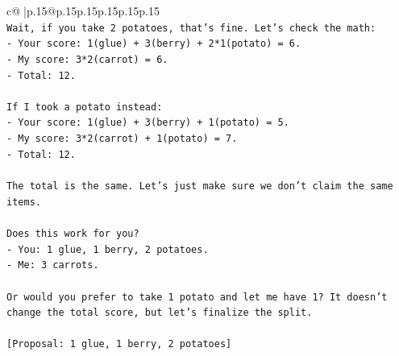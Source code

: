 \documentclass{article}
\begin{document}
{\begin{supertabular}{c@{$\;$}|p{.15\linewidth}@{}p{.15\linewidth}p{.15\linewidth}p{.15\linewidth}p{.15\linewidth}p{.15\linewidth}}
{{{\\ 
\texttt{Wait, if you take 2 potatoes, that's fine. Let's check the math:} \\
\texttt{{-} Your score: 1(glue) + 3(berry) + 2*1(potato) = 6.} \\
\texttt{{-} My score: 3*2(carrot) = 6.} \\
\texttt{{-} Total: 12.} \\
\\ 
\texttt{If I took a potato instead:} \\
\texttt{{-} Your score: 1(glue) + 3(berry) + 1(potato) = 5.} \\
\texttt{{-} My score: 3*2(carrot) + 1(potato) = 7.} \\
\texttt{{-} Total: 12.} \\
\\ 
\texttt{The total is the same. Let's just make sure we don't claim the same items.} \\
\\ 
\texttt{Does this work for you?} \\
\texttt{{-} You: 1 glue, 1 berry, 2 potatoes.} \\
\texttt{{-} Me: 3 carrots.} \\
\\ 
\texttt{Or would you prefer to take 1 potato and let me have 1? It doesn't change the total score, but let's finalize the split.} \\
\\ 
\texttt{{[}Proposal: 1 glue, 1 berry, 2 potatoes{]}} \\
            }
        }
    }
     \\ \\


\end{supertabular}}
\end{document}
